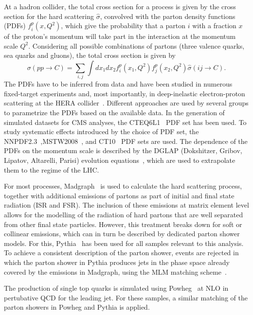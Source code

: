 At a hadron collider, the total cross section for a process is given by the cross section for the hard scattering $\hat{\sigma}$, convolved with the parton density functions (PDFs) $f^p_i(x,Q^2)$, which give the probability that a parton $i$ with a fraction $x$ of the proton's momentum will take part in the interaction at the momentum scale $Q^2$. Considering all possible combinations of partons (three valence quarks, sea quarks and gluons), the total cross section is given by
\begin{equation}
\sigma (pp \rightarrow C)  = \sum\limits_{i,j} \int dx_1 dx_2 f^p_i (x_1,Q^2) f^p_j(x_2,Q^2) \hat{\sigma}(ij\rightarrow C).
\end{equation} 
The PDFs have to be inferred from data and have been studied in numerous fixed-target experiments and, most importantly, in deep-inelastic electron-proton scattering at the HERA collider~\cite{Aaron:2009aa}. Different approaches are used by several groups to parametrize the PDFs based on the available data. In the generation of simulated datasets for CMS analyses, the CTEQ6L1~\cite{Pumplin:2002vw} PDF set has been used. To study systematic effects introduced by the choice of PDF set, the NNPDF2.3~\cite{Ball:2012cx},MSTW2008~\cite{Martin:2009iq}, and CT10~\cite{Lai:2010vv} PDF sets are used. The dependence of the PDFs on the momentum scale is described by the DGLAP (Dokshitzer, Gribov, Lipatov, Altarelli, Parisi) evolution equations~\cite{Gribov,Altarelli:1977zs,Dokshitzer}, which are used to extrapolate them to the regime of the LHC. 

For most processes, Madgraph~\cite{Alwall:2011uj} is used to calculate the hard scattering process, together with additional emissions of partons as part of initial and final state radiation (ISR and FSR). The inclusion of these emissions at matrix element level allows for the modelling of the radiation of hard partons that are well separated from other final state particles. However, this treatment breaks down for soft or collinear emissions, which can in turn be described by dedicated parton shower models. For this, Pythia~\cite{Pythia} has been used for all samples relevant to this analysis. To achieve a consistent description of the parton shower, events are rejected in which the parton shower in Pythia produces jets in the phase space already covered by the emissions in Madgraph, using the MLM matching scheme~\cite{Hoche:2006ph}. 

The production of single top quarks is simulated using Powheg~\cite{Powheg,Alioli:2009je,Re:2010bp} at NLO in pertubative QCD for the leading jet. For these samples, a similar matching of the parton showers in Powheg and Pythia is applied.  
 
